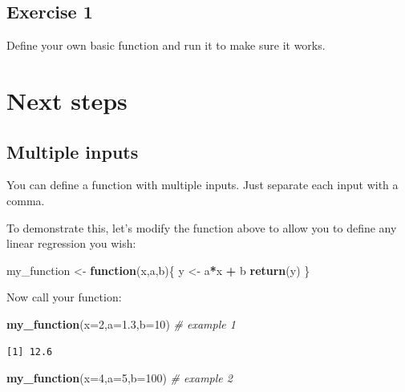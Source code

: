 \documentclass[
]{book}
\newenvironment{Shaded}{\begin{snugshade}}{\end{snugshade}}
\newcommand{\CommentTok}[1]{\textcolor[rgb]{0.56,0.35,0.01}{\textit{#1}}}
\newcommand{\ControlFlowTok}[1]{\textcolor[rgb]{0.13,0.29,0.53}{\textbf{#1}}}
\newcommand{\DataTypeTok}[1]{\textcolor[rgb]{0.13,0.29,0.53}{#1}}
\newcommand{\DecValTok}[1]{\textcolor[rgb]{0.00,0.00,0.81}{#1}}
\newcommand{\FloatTok}[1]{\textcolor[rgb]{0.00,0.00,0.81}{#1}}
\newcommand{\KeywordTok}[1]{\textcolor[rgb]{0.13,0.29,0.53}{\textbf{#1}}}
\newcommand{\NormalTok}[1]{#1}
\newcommand{\OperatorTok}[1]{\textcolor[rgb]{0.81,0.36,0.00}{\textbf{#1}}}
\newcommand{\StringTok}[1]{\textcolor[rgb]{0.31,0.60,0.02}{#1}}
\begin{document}
\hypertarget{exercise-1-5}{%
\subsection*{Exercise 1}\label{exercise-1-5}}

Define your own basic function and run it to make sure it works.

\hypertarget{next-steps}{%
\section*{Next steps}\label{next-steps}}

\hypertarget{multiple-inputs}{%
\subsection*{Multiple inputs}\label{multiple-inputs}}

You can define a function with multiple inputs. Just separate each input with a comma.

To demonstrate this, let's modify the function above to allow you to define any linear regression you wish:

\begin{Shaded}
\begin{Highlighting}[]
\NormalTok{my_function <-}\StringTok{ }\ControlFlowTok{function}\NormalTok{(x,a,b)\{}
\NormalTok{  y <-}\StringTok{ }\NormalTok{a}\OperatorTok{*}\NormalTok{x }\OperatorTok{+}\StringTok{ }\NormalTok{b}
  \KeywordTok{return}\NormalTok{(y)}
\NormalTok{\}}
\end{Highlighting}
\end{Shaded}

Now call your function:

\begin{Shaded}
\begin{Highlighting}[]
\KeywordTok{my_function}\NormalTok{(}\DataTypeTok{x=}\DecValTok{2}\NormalTok{,}\DataTypeTok{a=}\FloatTok{1.3}\NormalTok{,}\DataTypeTok{b=}\DecValTok{10}\NormalTok{) }\CommentTok{# example 1}
\end{Highlighting}
\end{Shaded}

\begin{verbatim}
[1] 12.6
\end{verbatim}

\begin{Shaded}
\begin{Highlighting}[]
\KeywordTok{my_function}\NormalTok{(}\DataTypeTok{x=}\DecValTok{4}\NormalTok{,}\DataTypeTok{a=}\DecValTok{5}\NormalTok{,}\DataTypeTok{b=}\DecValTok{100}\NormalTok{) }\CommentTok{# example 2}
\end{Highlighting}
\end{Shaded}
\end{document}
